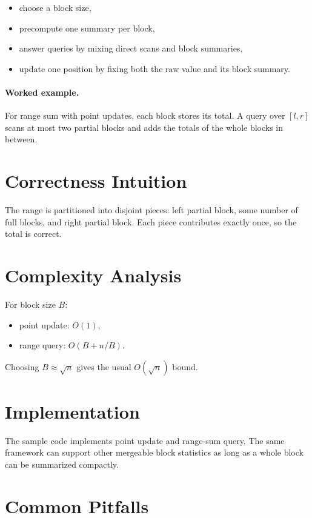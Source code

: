 \begin{itemize}
  \item choose a block size,
  \item precompute one summary per block,
  \item answer queries by mixing direct scans and block summaries,
  \item update one position by fixing both the raw value and its block summary.
\end{itemize}

\paragraph{Worked example.}
For range sum with point updates, each block stores its total. A query over \([l, r]\) scans at most two partial blocks
and adds the totals of the whole blocks in between.

\section*{Correctness Intuition}

The range is partitioned into disjoint pieces: left partial block, some number of full blocks, and right partial block.
Each piece contributes exactly once, so the total is correct.

\section*{Complexity Analysis}

For block size \(B\):
\begin{itemize}
  \item point update: \(O(1)\),
  \item range query: \(O(B + n/B)\).
\end{itemize}
Choosing \(B \approx \sqrt{n}\) gives the usual \(O(\sqrt{n})\) bound.

\section*{Implementation}

The sample code implements point update and range-sum query. The same framework can support other mergeable block
statistics as long as a whole block can be summarized compactly.

\section*{Common Pitfalls}

